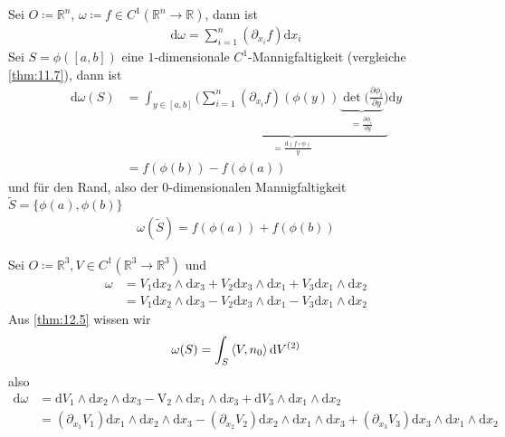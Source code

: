 \begin{example} \label{thm:8.4}
  \begin{enum-arab}
  \item
    Sei $O \coloneq \mathbb{R}^n$, $\omega \coloneq f \in C^1 (\mathbb{R}^n \to \mathbb{R})$, dann ist
    \begin{align*}
      \mathrm d \omega = \sum_{i=1}^n (\partial_{x_i}f) \mathrm d x_i
    \end{align*}
    Sei $S = \phi([a,b])$ eine $1$-dimensionale $C^1$-Mannigfaltigkeit (vergleiche \ref{thm:11.7}), dann ist
    \begin{align*}
      \mathrm d \omega(S) &= \int_{y \in [a,b]} \underbrace{\bigg( \sum_{i=1}^n (\partial_{x_i}f)(\phi(y)) \underbrace{\det ( \tfrac{\partial \phi_i}{\partial y}}_{= \frac{\partial \phi_i}{\partial y}} \bigg)}_{= \frac{\mathrm d (f\circ \phi)}{y}} \mathrm d y \\
      &= f(\phi(b)) - f(\phi(a))
    \end{align*}
    und für den Rand, also der $0$-dimensionalen Mannigfaltigkeit $\tilde S = \{\phi(a), \phi(b)\}$
    \begin{align*}
      \omega(\tilde S) = f(\phi(a)) + f(\phi(b))
    \end{align*}
  \item
    Sei $O \coloneq \mathbb{R}^3, V \in C^1 (\mathbb{R}^3 \to \mathbb{R}^3)$ und
    \begin{align*}
      \omega &= V_1 \mathrm d x_2 \wedge \mathrm d x_3 + V_2 \mathrm d x_3 \wedge \mathrm d x_1 + V_3 \mathrm d x_1 \wedge \mathrm d x_2 \\
      &= V_1 \mathrm d x_2 \wedge \mathrm d x_3 - V_2 \mathrm d x_3 \wedge \mathrm d x_1 - V_3 \mathrm d x_1 \wedge \mathrm d x_2
    \end{align*}
    Aus \ref{thm:12.5} wissen wir
    \begin{align*}
      \omega(S) = \int_S \braket{V, n_0} \mathrm d V^{(2)}
    \end{align*}
    also
    \begin{align*}
      \mathrm d \omega &= \mathrm d V_1 \wedge \mathrm d x_2 \wedge \mathrm d x_3 - \mathrm V_2 \wedge \mathrm d x_1 \wedge \mathrm d x_3 + \mathrm d V_3 \wedge \mathrm d x_1 \wedge \mathrm d x_2 \\
      &= (\partial_{x_1} V_1) \mathrm d x_1 \wedge \mathrm d x_2 \wedge \mathrm d x_3 - (\partial_{x_2} V_2) \mathrm d x_2 \wedge \mathrm d x_1 \wedge \mathrm d x_3 + (\partial_{x_3} V_3) \mathrm d x_3 \wedge \mathrm d x_1 \wedge \mathrm d x_2 \\

\end{align*}
\end{enum-arab}
\end{example}
